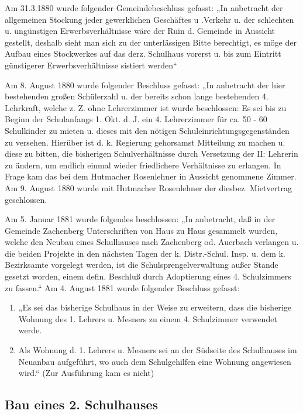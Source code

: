 \documentclass[12pt,a4paper]{book}
\begin{document}
Am 31.3.1880 wurde folgender Gemeindebeschluss gefasst: „In anbetracht der
allgemeinen Stockung jeder gewerklichen Geschäftes u .Verkehr u. der schlechten
u. ungünstigen Erwerbsverhältnisse wäre der Ruin d. Gemeinde in Aussicht
gestellt, deshalb sieht man sich zu der unterlässigen Bitte berechtigt, es möge
der Aufbau eines Stockwerkes auf das derz. Schulhaus vorerst u. bis zum Eintritt
günstigerer Erwerbsverhältnisse sistiert werden“

Am 8. August 1880 wurde folgender Beschluss gefasst: „In anbetracht der hier
bestehenden großen Schülerzahl u. der bereits schon lange bestehenden 4.
Lehrkraft, welche z. Z. ohne Lehrerzimmer ist wurde beschlossen: Es sei bis zu
Beginn der Schulanfangs 1. Okt. d. J. ein 4. Lehrerzimmer für ca. 50 - 60
Schulkinder zu mieten u. dieses mit den nötigen Schuleinrichtungsgegenständen zu
versehen. Hierüber ist d. k. Regierung gehorsamst Mitteilung zu machen u. diese
zu bitten, die bisherigen Schulverhältnisse durch Versetzung der II: Lehrerin zu
ändern, um endlich einmal wieder friedlichere Verhältnisse zu erlangen. In Frage
kam das bei dem Hutmacher Rosenlehner in Aussicht genommene Zimmer. Am 9. August
1880 wurde mit Hutmacher Rosenlehner der diesbez. Mietvertrag geschlossen.

Am 5. Januar 1881 wurde folgendes beschlossen: „In anbetracht, daß in der
Gemeinde Zachenberg Unterschriften von Haus zu Haus gesammelt wurden, welche den
Neubau eines Schulhauses nach Zachenberg od. Auerbach verlangen u. die beiden
Projekte in den nächsten Tagen der k. Distr.-Schul. Insp. u. dem k. Bezirksamte
vorgelegt werden, ist die Schulsprengelverwaltung außer Stande gesetzt worden,
einem defin. Beschluß durch Adoptierung eines 4. Schulzimmers zu fassen.“ Am 4.
August 1881 wurde folgender Beschluss gefasst:

\begin{enumerate}
\item „Es sei das bisherige Schulhaus in der Weise zu erweitern, dass die
bisherige Wohnung des 1. Lehrers u. Mesners zu einem 4. Schulzimmer verwendet
werde.

\item Als Wohnung d. 1. Lehrers u. Mesners sei an der Südseite des Schulhauses
im Neuanbau aufgeführt, wo auch dem Schulgehilfen eine Wohnung angewiesen wird.“
(Zur Ausführung kam es nicht)
\end{enumerate}

\subsection[Bau eines 2. Schulhauses]{Bau eines 2.
Schulhauses\protect\footnotemark{}\protect{}}
\end{document}
